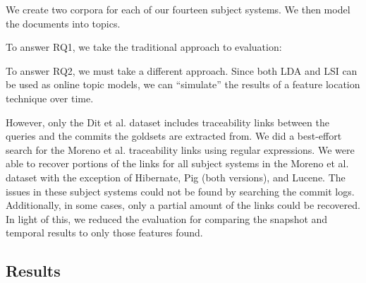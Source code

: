 We create two corpora for each of our fourteen subject systems.
We then model the documents into topics.

To answer RQ1, we take the traditional approach to evaluation:

To answer RQ2, we must take a different approach.
Since both LDA and LSI can be used as online topic models, we can
``simulate'' the results of a feature location technique over time.

However, only the Dit et al. dataset includes traceability links between
the queries and the commits the goldsets are extracted from.
We did a best-effort search for the Moreno et al. traceability links
using regular expressions.
We were able to recover portions of the links for all subject systems in
the Moreno et al. dataset with the exception of Hibernate, Pig (both versions), and Lucene.
The issues in these subject systems could not be found by searching the commit logs.
Additionally, in some cases, only a partial amount of the links could be
recovered. In light of this, we reduced the evaluation for comparing the
snapshot and temporal results to only those features found.



\subsection{Results}

